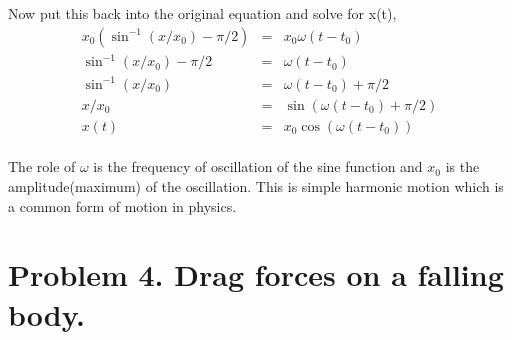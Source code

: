 \documentclass[11pt]{amsart}
\begin{document}
Now put this back into the original equation and solve for x(t),
\begin{eqnarray*}
 x_{0}(\sin^{-1}(x/x_{0}) - \pi/2) &=& x_{0}\omega{}(t-t_{0}) 
\\
\sin^{-1}(x/x_{0}) - \pi/2 &=& \omega{}(t-t_{0}) \\
\sin^{-1}(x/x_{0}) &=& \omega(t-t_{0}) + \pi/2 
\\
x/x_{0} &=& \sin(\omega(t-t_{0}) + \pi/2) 
\\
x(t) &=& x_{0} \cos(\omega(t-t_{0}))
\end{eqnarray*} \\
The role of $\omega$ is the frequency of oscillation of the sine function and $x_{0}$ is the amplitude(maximum) of the oscillation. This is simple harmonic motion which is a common form of motion in physics.

\section{Problem 4. Drag forces on a falling body.}
\end{document}
